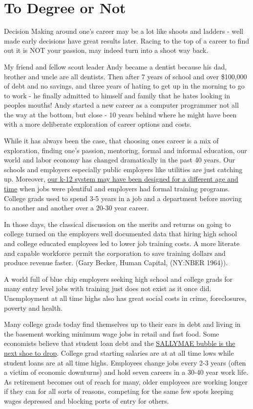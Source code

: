 \documentclass[]{memoir}
\begin{document}
\section{To Degree or Not}

Decision Making around one's career may be a lot like shoots and ladders
- well made early decisions have great results later. Racing to the top
of a career to find out it is NOT your passion, may indeed turn into a
shoot way back.

My friend and fellow scout leader Andy became a dentist because his dad,
brother and uncle are all dentists. Then after 7 years of school and
over \$100,000 of debt and no savings, and three years of hating to get
up in the morning to go to work - he finally admitted to himself and
family that he hates looking in peoples mouths! Andy started a new
career as a computer programmer not all the way at the bottom, but close
- 10 years behind where he might have been with a more deliberate
exploration of career options and costs.

While it has always been the case, that choosing ones career is a mix of
exploration, finding one's passion, mentoring, formal and informal
education, our world and labor economy has changed dramatically in the
past 40 years. Our schools and employers especially public employers
like utilities are just catching up. Moreover,
\href{http://www.youtube.com/watch?v=zDZFcDGpL4U}{our k-12 system may
have been designed for a different age and time} when jobs were
plentiful and employers had formal training programs. College grads used
to spend 3-5 years in a job and a department before moving to another
and another over a 20-30 year career.

In those days, the classical discussion on the merits and returns on
going to college turned on the employers well documented data that
hiring high school and college educated employees led to lower job
training costs. A more literate and capable workforce permit the
corporation to save training dollars and produce revenue faster. (Gary
Becker, Human Capital, (NY:NBER 1964)).

A world full of blue chip employers seeking high school and college
grads for many entry level jobs with training just does not exist as it
once did. Unemployment at all time highs also has great social costs in
crime, foreclosures, poverty and health.

Many college grads today find themselves up to their ears in debt and
living in the basement working minimum wage jobs in retail and fast
food. Some economists believe that student loan debt and the
\href{http://blogs.reuters.com/great-debate/2013/03/07/student-loan-bubble-babble/}{SALLYMAE
bubble is the next shoe to drop}. College grad starting salaries are at
at all time lows while student loans are at all time highs. Employees
change jobs every 2-3 years (often a victim of economic downturns) and
hold seven careers in a 30-40 year work life. As retirement becomes out
of reach for many, older employees are working longer if they can for
all sorts of reasons, competing for the same few spots keeping wages
depressed and blocking ports of entry for others.
\end{document}
